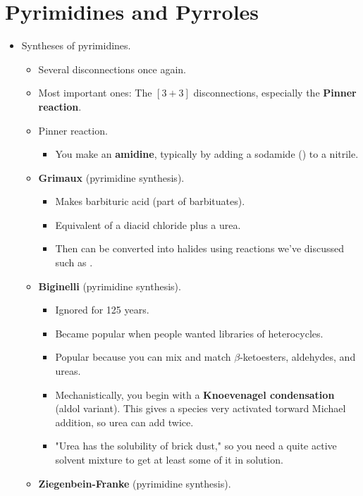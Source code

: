 \documentclass[../notes.tex]{subfiles}
\begin{document}
\section{Pyrimidines and Pyrroles}
\begin{itemize}
    \item {}Syntheses of pyrimidines.
    \begin{itemize}
        \item Several disconnections once again.
        \item Most important ones: The $[3+3]$ disconnections, especially the \textbf{Pinner reaction}.
        \item Pinner reaction.
        \begin{itemize}
            \item You make an \textbf{amidine}, typically by adding a sodamide () to a nitrile.
        \end{itemize}
        \item \textbf{Grimaux} (pyrimidine synthesis).
        \begin{itemize}
            \item Makes barbituric acid (part of barbituates).
            \item Equivalent of a diacid chloride plus a urea.
            \item Then can be converted into halides using reactions we've discussed such as .
        \end{itemize}
        \item \textbf{Biginelli} (pyrimidine synthesis).
        \begin{itemize}
            \item Ignored for 125 years.
            \item Became popular when people wanted libraries of heterocycles.
            \item Popular because you can mix and match $\beta$-ketoesters, aldehydes, and ureas.
            \item Mechanistically, you begin with a \textbf{Knoevenagel condensation} (aldol variant). This gives a species very activated torward Michael addition, so urea can add twice.
            \item "Urea has the solubility of brick dust," so you need a quite active solvent mixture to get at least some of it in solution.
        \end{itemize}
        \item \textbf{Ziegenbein-Franke} (pyrimidine synthesis).

\end{itemize}
\end{itemize}
\end{document}
